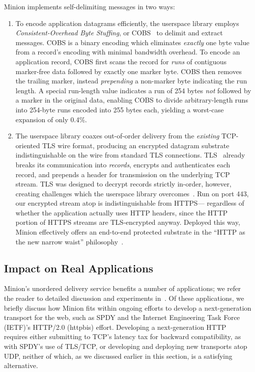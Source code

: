 Minion implements self-delimiting messages in two ways:
\begin{enumerate}
    \item To encode application datagrams efficiently, 
    the userspace library employs 
    {\em Consistent-Overhead Byte Stuffing}, or
    COBS~\cite{cheshire97consistent}
    to delimit and extract messages.
    COBS is a binary encoding
    which eliminates {\em exactly} one byte value from a record's encoding
    with minimal bandwidth overhead.
    To encode an application record,
    COBS first scans the record for {\em runs}
    of contiguous marker-free data followed by exactly one marker byte.
    COBS then removes the trailing marker,
    instead {\em prepending} a non-marker byte indicating the run length.
    A special run-length value indicates a run of 254 bytes
    {\em not} followed by a marker in the original data,
    enabling COBS to divide arbitrary-length runs into 254-byte runs
    encoded into 255 bytes each,
    yielding a worst-case expansion of only 0.4\%.

    \item The userspace library 
    coaxes out-of-order delivery from
    the {\em existing} TCP-oriented TLS wire format,
    producing an encrypted datagram substrate
    indistinguishable on the wire from standard TLS connections.
    TLS~\cite{rfc5246} already breaks its communication into {\em records},
    encrypts and authenticates each record,
    and prepends a header
    for transmission on the underlying TCP stream.
    TLS was designed to decrypt records strictly in-order, however,
    creating challenges 
    which the userspace library overcomes~\cite{nowlan12fitting}.
    Run on port 443,
    our encrypted stream atop \utcp is indistinguishable from HTTPS---%
    regardless of whether the application actually uses HTTP headers,
    since the HTTP portion of HTTPS streams are TLS-encrypted anyway.
    Deployed this way,
    Minion effectively offers an end-to-end protected substrate
    in the ``HTTP as the new narrow waist'' philosophy~\cite{popa10http}.
\end{enumerate}

\subsection{Impact on Real Applications}

Minion's unordered delivery service 
benefits a number of applications;
we refer the reader to detailed discussion and experiments 
in~\cite{nowlan12fitting}.
Of these applications,
we briefly discuss how Minion fits within
ongoing efforts to develop a next-generation transport for the web,
such as SPDY\cite{spdy} and the Internet Engineering Task Force (IETF)'s 
HTTP/2.0 (httpbis) effort.
Developing a next-generation HTTP 
requires either submitting to TCP's latency tax
for backward compatibility,
as with SPDY's use of TLS/TCP,
or developing and deploying new transports atop UDP,
neither of which,
as we discussed earlier in this section,
is a satisfying alternative.

